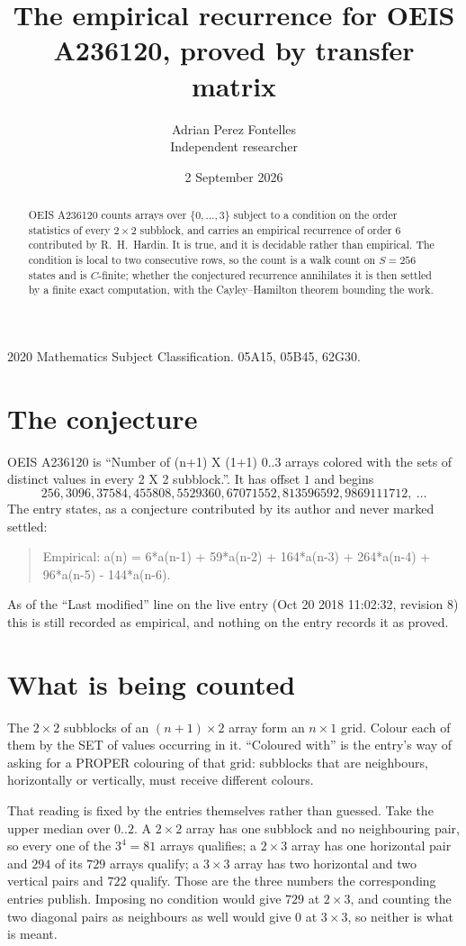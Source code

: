 \documentclass[11pt,a4paper]{article}
\title{The empirical recurrence for OEIS A236120, proved by transfer matrix}
\author{Adrian Perez Fontelles\\ \small Independent researcher}
\date{2 September 2026}
\theoremstyle{plain}
\theoremstyle{definition}
\begin{document}
\maketitle

\begin{abstract}
OEIS A236120 counts arrays over $\{0,\dots,3\}$ subject to a condition on the order
statistics of every $2\times2$ subblock, and carries an empirical recurrence of order
$6$ contributed by R.~H.~Hardin. It is true, and it is decidable rather than empirical.
The condition is local to two consecutive rows, so the count is a walk count on $S=256$
states and is $C$-finite; whether the conjectured recurrence annihilates it is then settled by
a finite exact computation, with the Cayley--Hamilton theorem bounding the work.
\end{abstract}

\noindent\small 2020 Mathematics Subject Classification. 05A15, 05B45, 62G30.\normalsize

\section{The conjecture}

OEIS A236120 is ``Number of (n+1) X (1+1) 0..3 arrays colored with the sets of distinct values in every 2 X 2 subblock.''. It has offset $1$ and begins
\[
256, 3096, 37584, 455808, 5529360, 67071552, 813596592, 9869111712,\ \dots
\]
The entry states, as a conjecture contributed by its author and never marked settled:
\begin{quote}
Empirical: a(n) = 6*a(n-1) + 59*a(n-2) + 164*a(n-3) + 264*a(n-4) + 96*a(n-5) - 144*a(n-6).
\end{quote}
As of the ``Last modified'' line on the live entry (Oct 20 2018 11:02:32, revision 8) this is still
recorded as empirical, and nothing on the entry records it as proved.

\section{What is being counted}

The $2\times2$ subblocks of an $(n+1)\times2$ array form an
$n\times1$ grid. Colour each of them by the SET of values occurring in it. ``Coloured with'' is the entry's way of
asking for a PROPER colouring of that grid: subblocks that are neighbours, horizontally or
vertically, must receive different colours.

That reading is fixed by the entries themselves rather than guessed. Take the upper median
over $0..2$. A $2\times2$ array has one subblock and no neighbouring pair, so every one of the
$3^4=81$ arrays qualifies; a $2\times3$ array has one horizontal pair and $294$ of its $729$
arrays qualify; a $3\times3$ array has two horizontal and two vertical pairs and $722$
qualify. Those are the three numbers the corresponding entries publish. Imposing no condition
would give $729$ at $2\times3$, and counting the two diagonal pairs as neighbours as well
would give $0$ at $3\times3$, so neither is what is meant.
\end{document}
